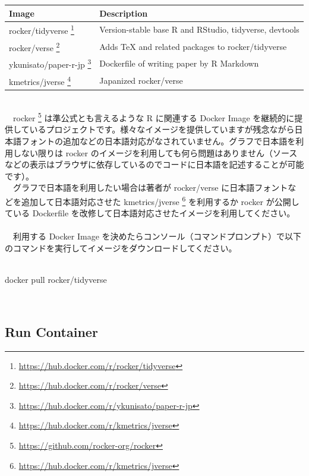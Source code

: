 \documentclass[
  12pt,
]{book}
\newenvironment{Shaded}{\begin{snugshade}}{\end{snugshade}}
\newcommand{\ExtensionTok}[1]{#1}
\newcommand{\NormalTok}[1]{#1}
\DeclareRobustCommand{\href}[2]{#2\footnote{\url{#1}}}
\begin{document}
\begin{longtable}[]{@{}ll@{}}
\toprule
Image & Description \\
\midrule
\endhead
\href{https://hub.docker.com/r/rocker/tidyverse}{rocker/tidyverse } & Version-stable base R and RStudio, tidyverse, devtools \\
\href{https://hub.docker.com/r/rocker/verse}{rocker/verse } & Adds TeX and related packages to rocker/tidyverse \\
\href{https://hub.docker.com/r/ykunisato/paper-r-jp}{ykunisato/paper-r-jp } & Dockerfile of writing paper by R Markdown \\
\href{https://hub.docker.com/r/kmetrics/jverse}{kmetrics/jverse } & Japanized rocker/verse \\
\bottomrule
\end{longtable}

　\\
　\href{https://github.com/rocker-org/rocker}{rocker } は準公式とも言えるような R に関連する Docker Image を継続的に提供しているプロジェクトです。様々なイメージを提供していますが残念ながら日本語フォントの追加などの日本語対応がなされていません。グラフで日本語を利用しない限りは rocker のイメージを利用しても何ら問題はありません（ソースなどの表示はブラウザに依存しているのでコードに日本語を記述することが可能です）。\\
　グラフで日本語を利用したい場合は著者が rocker/verse に日本語フォントなどを追加して日本語対応させた \href{https://hub.docker.com/r/kmetrics/jverse}{kmetrics/jverse } を利用するか rocker が公開している Dockerfile を改修して日本語対応させたイメージを利用してください。\\
　\\
　利用する Docker Image を決めたらコンソール（コマンドプロンプト）で以下のコマンドを実行してイメージをダウンロードしてください。\\
　

\begin{Shaded}
\begin{Highlighting}[numbers=left,,]
\ExtensionTok{docker}\NormalTok{ pull rocker/tidyverse}
\end{Highlighting}
\end{Shaded}

　

\hypertarget{run-container}{%
\subsection{Run Container}\label{run-container}}
\end{document}
